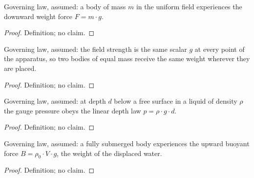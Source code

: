 \begin{definition}
\label{def:IPhO2026Problems_problem_IPhO_2026_1_A_1:IsWeightForce}
Governing law, assumed: a body of mass $m$ in the uniform field experiences
the downward weight force $F = m \cdot g$.
\end{definition}
\begin{proof}
Definition; no claim.
\end{proof}

\begin{definition}
\label{def:IPhO2026Problems_problem_IPhO_2026_1_A_1:IsUniformGravityField}
Governing law, assumed: the field strength is the same scalar $g$ at every
point of the apparatus, so two bodies of equal mass receive the same weight
wherever they are placed.
\end{definition}
\begin{proof}
Definition; no claim.
\end{proof}

\begin{definition}
\label{def:IPhO2026Problems_problem_IPhO_2026_1_A_1:IsHydrostaticPressure}
Governing law, assumed: at depth $d$ below a free surface in a liquid of
density $\rho$ the gauge pressure obeys the linear depth law
$p = \rho \cdot g \cdot d$.
\end{definition}
\begin{proof}
Definition; no claim.
\end{proof}

\begin{definition}
\label{def:IPhO2026Problems_problem_IPhO_2026_1_A_1:IsBuoyantForce}
Governing law, assumed: a fully submerged body experiences the upward buoyant
force $B = \rho_0 \cdot V \cdot g$, the weight of the displaced water.
\end{definition}
\begin{proof}
Definition; no claim.
\end{proof}


